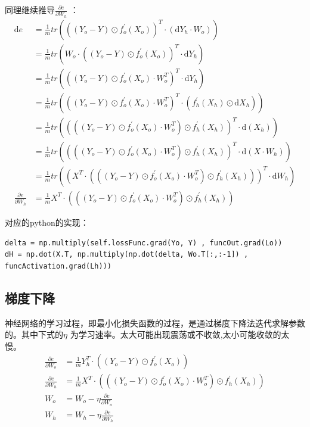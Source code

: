 \documentclass[12pt, a4paper, oneside]{ctexart}
\begin{document}
同理继续推导$\frac{\partial e}{\partial W_h}$ ：
\begin{align}
\mathrm{d}e &= \frac{1}{m}tr(((Y_o - Y) \odot f_o^{'}(X_o))^T \cdot (\mathrm{d}Y_h \cdot W_o))  \label{eq9} \\
    &= \frac{1}{m}tr(W_o \cdot ((Y_o - Y) \odot f_o^{'}(X_o))^T \cdot \mathrm{d}Y_h ) \nonumber\\
    &= \frac{1}{m}tr(((Y_o - Y) \odot f_o^{'}(X_o) \cdot W_o^T)^T \cdot \mathrm{d}Y_h ) \nonumber\\
    &= \frac{1}{m}tr(((Y_o - Y) \odot f_o^{'}(X_o) \cdot W_o^T)^T \cdot (f_h^{'}(X_h) \odot \mathrm{d}X_h) )  \nonumber\\
    &= \frac{1}{m}tr((((Y_o - Y) \odot f_o^{'}(X_o) \cdot W_o^T) \odot f_h^{'}(X_h))^T \cdot \mathrm{d}(X_h) ) \label{eq10} \\
    &= \frac{1}{m}tr((((Y_o - Y) \odot f_o^{'}(X_o) \cdot W_o^T) \odot f_h^{'}(X_h))^T \cdot \mathrm{d}(X \cdot W_h) ) \nonumber\\
    &= \frac{1}{m}tr((X^T \cdot (((Y_o - Y) \odot f_o^{'}(X_o) \cdot W_o^T) \odot f_h^{'}(X_h)))^T \cdot \mathrm{d}W_h ) \nonumber\\
    \frac{\partial e}{\partial W_h} &= \frac{1}{m}X^T \cdot (((Y_o - Y) \odot f_o^{'}(X_o) \cdot W_o^T) \odot f_h^{'}(X_h))  \label{eq11}
\end{align}

对应的python的实现：
\begin{lstlisting}
delta = np.multiply(self.lossFunc.grad(Yo, Y) , funcOut.grad(Lo))
dH = np.dot(X.T, np.multiply(np.dot(delta, Wo.T[:,:-1]) , funcActivation.grad(Lh)))
\end{lstlisting}
\subsection{梯度下降}
神经网络的学习过程，即最小化损失函数的过程，是通过梯度下降法迭代求解参数的。其中下式的$\eta$
为学习速率。太大可能出现震荡或不收敛,太小可能收敛的太慢。
\begin{align}    
    \frac{\partial e}{\partial W_o} &= \frac{1}{m}Y_h^T \cdot ((Y_o - Y) \odot f_o^{'}(X_o))    \nonumber \\
    \frac{\partial e}{\partial W_h} &= \frac{1}{m}X^T \cdot (((Y_o - Y) \odot f_o^{'}(X_o) \cdot W_o^T) \odot f_h^{'}(X_h))  \nonumber \\
    W_o &= W_o - \eta\frac{\partial e}{\partial W_o} \nonumber \\
    W_h &= W_h - \eta\frac{\partial e}{\partial W_h} \nonumber
\end{align}
\end{document}

